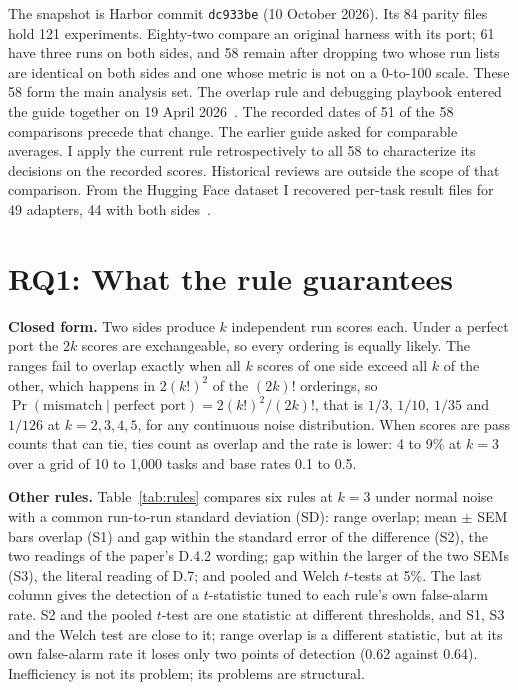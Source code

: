 \documentclass[conference]{IEEEtran}
\begin{document}
The snapshot is Harbor commit \texttt{dc933be} (10 October 2026). Its 84 parity files hold 121 experiments. Eighty-two compare an original harness with its port; 61 have three runs on both sides, and 58 remain after dropping two whose run lists are identical on both sides and one whose metric is not on a 0-to-100 scale. These 58 form the main analysis set. The overlap rule and debugging playbook entered the guide together on 19 April 2026~\cite{harbor_guide_change}. The recorded dates of 51 of the 58 comparisons precede that change. The earlier guide asked for comparable averages. I apply the current rule retrospectively to all 58 to characterize its decisions on the recorded scores. Historical reviews are outside the scope of that comparison. From the Hugging Face dataset I recovered per-task result files for 49 adapters, 44 with both sides~\cite{harbor_parity_hf}.

\section{RQ1: What the rule guarantees}
\label{sec:rq1}

\textbf{Closed form.} Two sides produce $k$ independent run scores each. Under a perfect port the $2k$ scores are exchangeable, so every ordering is equally likely. The ranges fail to overlap exactly when all $k$ scores of one side exceed all $k$ of the other, which happens in $2(k!)^2$ of the $(2k)!$ orderings, so $\Pr(\text{mismatch} \mid \text{perfect port}) = 2(k!)^2/(2k)!$, that is $1/3$, $1/10$, $1/35$ and $1/126$ at $k = 2, 3, 4, 5$, for any continuous noise distribution. When scores are pass counts that can tie, ties count as overlap and the rate is lower: 4 to 9\% at $k=3$ over a grid of 10 to 1{,}000 tasks and base rates 0.1 to 0.5.

\textbf{Other rules.} Table~\ref{tab:rules} compares six rules at $k=3$ under normal noise with a common run-to-run standard deviation (SD): range overlap; mean $\pm$ SEM bars overlap (S1) and gap within the standard error of the difference (S2), the two readings of the paper's D.4.2 wording; gap within the larger of the two SEMs (S3), the literal reading of D.7; and pooled and Welch $t$-tests at 5\%. The last column gives the detection of a $t$-statistic tuned to each rule's own false-alarm rate. S2 and the pooled $t$-test are one statistic at different thresholds, and S1, S3 and the Welch test are close to it; range overlap is a different statistic, but at its own false-alarm rate it loses only two points of detection (0.62 against 0.64). Inefficiency is not its problem; its problems are structural.
\end{document}
